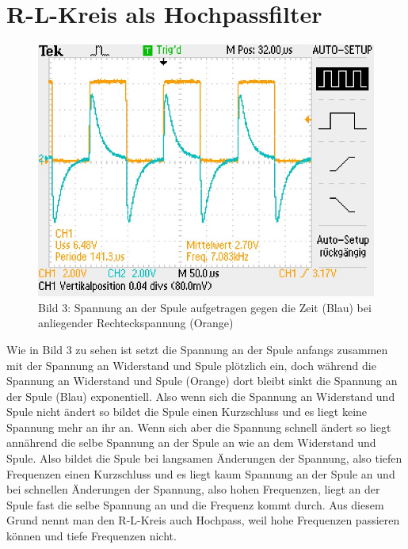 \section{R-L-Kreis als Hochpassfilter}
\begin{figure}[!htb]
    \centering
    \begin{minipage}[t]{0.7\linewidth}
        \centering
        \includegraphics[width=\linewidth]{F0006TEK.jpg}
    \end{minipage}
    \caption*{Bild 3: \small Spannung an der Spule aufgetragen gegen die Zeit (Blau) bei anliegender Rechteckspannung (Orange)}
\end{figure}
Wie in Bild 3 zu sehen ist setzt die Spannung an der Spule anfangs zusammen mit der Spannung an Widerstand und Spule plötzlich ein, doch während die Spannung an Widerstand und Spule (Orange) dort bleibt sinkt die Spannung an der Spule (Blau) exponentiell. Also wenn sich die Spannung an Widerstand und Spule nicht ändert so bildet die Spule einen Kurzschluss und es liegt keine Spannung mehr an ihr an. Wenn sich aber die Spannung schnell ändert so liegt annährend die selbe Spannung an der Spule an wie an dem Widerstand und Spule. Also bildet die Spule bei langsamen Änderungen der Spannung, also tiefen Frequenzen einen Kurzschluss und es liegt kaum Spannung an der Spule an und bei schnellen Änderungen der Spannung, also hohen Frequenzen, liegt an der Spule fast die selbe Spannung an und die Frequenz kommt durch. Aus diesem Grund nennt man den R-L-Kreis auch Hochpass, weil hohe Frequenzen passieren können und tiefe Frequenzen nicht.



